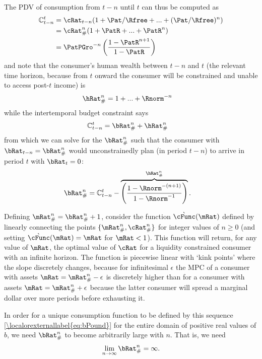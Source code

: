 \documentclass[../BufferStockTheory.tex]{subfiles}
\begin{document}
The PDV of consumption from $t-n$ until $t$ can thus be computed as
\begin{align}
   \mathbb{C}_{t-n}^{t}  & = \cRat_{t-n}(1+\Pat/\Rfree+ ... + (\Pat/\Rfree)^{n}) \notag
\\  & = \cRat_{\#}^{n}(1+\PatR+ ... + \PatR^{n}) \notag
\\  & = \PatPGro^{-n}\left(\frac{1-\PatR^{n+1}}{1-\PatR}\right) \label{PDVc}
\end{align}
and note that the consumer's human wealth between $t-n$ and $t$ (the relevant
time horizon, because from $t$ onward the consumer will be constrained
and unable to access post-$t$ income) is
\begin{align}
  \hRat_{\#}^{n}  & = 1+...+\Rnorm^{-n}
\end{align}
while the intertemporal budget constraint says
\begin{eqnarray*}
  \mathbb{C}_{t-n}^{t}  & = \bRat_{\#}^{n}+\hRat_{\#}^{n}
\end{eqnarray*}
from which we can solve for the $\bRat_{\#}^{n}$ such that
the consumer with $\bRat_{t-n} = \bRat_{\#}^{n}$ would
unconstrainedly plan (in period $t-n$) to arrive in period $t$ with
$\bRat_{t}=0$:
\begin{align}
\bRat_{\#}^{n} & =  \mathbb{C}_{t-n}^{t} - \overbrace{\left(\frac{1-\Rnorm^{-(n+1)}}{1-\Rnorm^{-1}}\right)}^{\hRat_{\#}^{n}} \label{eq:bPound}.
\end{align}

Defining $\mRat_{\#}^{n}=\bRat_{\#}^{n}+1$, consider the function
$\grave{\cFunc}(\mRat)$ defined by linearly connecting the points
$\{\mRat_{\#}^{n},\cRat_{\#}^{n}\}$ for integer values of $n \geq 0$
(and setting $\grave{\cFunc}(\mRat)=\mRat$ for $\mRat<1$).  This
function will return, for any value of $\mRat$, the optimal value of
$\cRat$ for a liquidity constrained consumer with an infinite horizon.
The function is piecewise linear with `kink points' where the slope
discretely changes, because for infinitesimal $\epsilon$ the MPC of a
consumer with assets $\mRat=\mRat_{\#}^{n}-\epsilon$ is discretely
higher than for a consumer with assets $\mRat=\mRat_{\#}^{n}+\epsilon$
because the latter consumer will spread a marginal dollar over more
periods before exhausting it.

In order for a unique consumption function to be defined by this
sequence \eqref{\localorexternallabel{eq:bPound}} for the entire domain of positive real
values of $b$, we need $\bRat_{\#}^{n}$ to become arbitrarily large with
$n$.  That is, we need
\begin{align}
  \lim_{n \rightarrow \infty} \bRat_{\#}^{n} = \infty. \label{eq:bToInfty}
\end{align}
\end{document}
